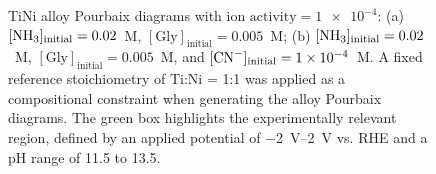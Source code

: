 \documentclass[journal=jacsat,manuscript=article]{achemso}
\begin{document}
\begin{figure}[htbp]
\begin{subfigure}[b]{0.45\textwidth}
        \par\medskip   
    \end{subfigure}
    \caption{TiNi alloy Pourbaix diagrams with $\text{ion activity} = \num{1e-4}$: (a) $[\ce{NH3}]_\text{initial} = 0.02$~M, $[\text{Gly}]_\text{initial} = 0.005$~M; (b) $[\ce{NH3}]_\text{initial} = 0.02$~M, $[\text{Gly}]_\text{initial} = 0.005$~M, and $[\ce{CN^-}]_\text{initial} = \num{1e-4}$~M. A fixed reference stoichiometry of Ti:Ni = 1:1 was applied as a compositional constraint when generating the alloy Pourbaix diagrams. The green box highlights the experimentally relevant region, defined by an applied potential of \SIrange{-2}{2}{V} vs. RHE and a pH range of 11.5 to 13.5.}
    \label{fig:TiNi_alloy_Pourbaix}
\end{figure}


\end{document}
